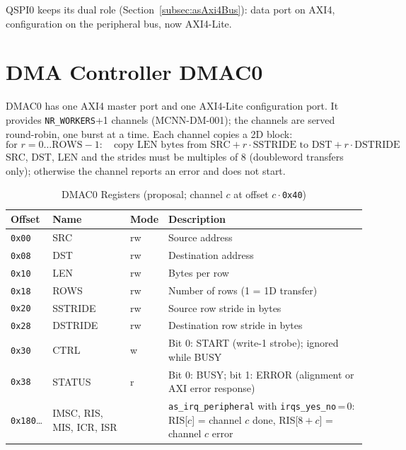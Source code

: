 QSPI0 keeps its dual role (Section~\ref{subsec:asAxi4Bus}): data port on
AXI4, configuration on the peripheral bus, now AXI4-Lite.

\section{DMA Controller DMAC0}
\label{sec:mcnndma}

DMAC0 has one AXI4 master port and one AXI4-Lite configuration port.
It provides \texttt{NR\_WORKERS}+1 channels (MCNN-DM-001); the channels are
served round-robin, one burst at a time.
Each channel copies a 2D block:
\[
  \text{for } r = 0 \ldots \text{ROWS}{-}1:\quad
  \text{copy LEN bytes from } \text{SRC} + r\cdot\text{SSTRIDE}
  \text{ to } \text{DST} + r\cdot\text{DSTRIDE}
\]
SRC, DST, LEN and the strides must be multiples of 8 (doubleword transfers
only); otherwise the channel reports an error and does not start.

\begin{table}[H]
\caption{DMAC0 Registers (proposal; channel $c$ at offset $c \cdot$\texttt{0x40})}
\label{tab:mcnndmaregs}
\centering
{\footnotesize
\begin{tabularx}{\textwidth}{|l |l |l |X|}
  \hline
  Offset & Name & Mode & Description \\
  \hline
  \hline
  \texttt{0x00} & SRC     & rw & Source address \\
  \hline
  \texttt{0x08} & DST     & rw & Destination address \\
  \hline
  \texttt{0x10} & LEN     & rw & Bytes per row \\
  \hline
  \texttt{0x18} & ROWS    & rw & Number of rows (1 = 1D transfer) \\
  \hline
  \texttt{0x20} & SSTRIDE & rw & Source row stride in bytes \\
  \hline
  \texttt{0x28} & DSTRIDE & rw & Destination row stride in bytes \\
  \hline
  \texttt{0x30} & CTRL    & w  & Bit 0: START (write-1 strobe); ignored while BUSY \\
  \hline
  \texttt{0x38} & STATUS  & r  & Bit 0: BUSY; bit 1: ERROR (alignment or AXI error response) \\
  \hline
  \hline
  \texttt{0x180}\ldots & IMSC, RIS, MIS, ICR, ISR & & \texttt{as\_irq\_peripheral}
    with \texttt{irqs\_yes\_no}\,=\,0: RIS[$c$] = channel $c$ done,
    RIS[$8{+}c$] = channel $c$ error \\
  \hline
\end{tabularx}}
\end{table}

